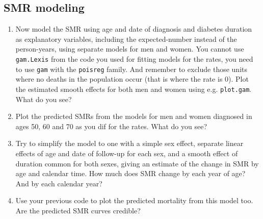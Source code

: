 \subsection{SMR modeling}
\begin{enumerate}[resume]
\item Now model the SMR using age and date of diagnosis and diabetes
  duration as explanatory variables, including the expected-number
  instead of the person-years, using separate models for
  men and women.
  You cannot use \texttt{gam.Lexis} from the code you used for
  fitting models for the rates, you need to use \texttt{gam} with
  the \texttt{poisreg} family. And remember to exclude those units
  where no deaths in the population occur (that is where the rate
  is 0).
  Plot the estimated smooth effects for both men and women using
  e.g. \texttt{plot.gam}. What do you see?
\item Plot the predicted SMRs from the models for men and women
  diagnosed in ages 50, 60 and 70 as you dif for the rates. What do
  you see?
\item Try to simplify the model to one with a simple sex effect,
  separate linear effects of age and date of follow-up for each
  sex, and a smooth effect of duration common for both sexes,
  giving an estimate of the change in SMR by age and calendar
  time. How much does SMR change by each year of age? And by each
  calendar year?
\item Use your previous code to plot the predicted mortality from this
  model too. Are the predicted SMR curves credible?
\end{enumerate}
